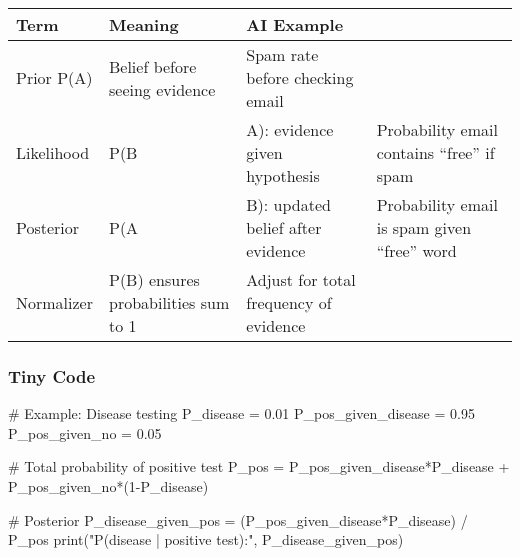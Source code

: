 \documentclass[
  letterpaper,
  DIV=11,
  numbers=noendperiod]{scrreprt}
\newenvironment{Shaded}{\begin{snugshade}}{\end{snugshade}}
\newcommand{\BuiltInTok}[1]{\textcolor[rgb]{0.00,0.23,0.31}{#1}}
\newcommand{\CommentTok}[1]{\textcolor[rgb]{0.37,0.37,0.37}{#1}}
\newcommand{\DecValTok}[1]{\textcolor[rgb]{0.68,0.00,0.00}{#1}}
\newcommand{\FloatTok}[1]{\textcolor[rgb]{0.68,0.00,0.00}{#1}}
\newcommand{\NormalTok}[1]{\textcolor[rgb]{0.00,0.23,0.31}{#1}}
\newcommand{\OperatorTok}[1]{\textcolor[rgb]{0.37,0.37,0.37}{#1}}
\newcommand{\StringTok}[1]{\textcolor[rgb]{0.13,0.47,0.30}{#1}}
\begin{document}
\begin{longtable}[]{@{}
  >{\raggedright\arraybackslash}p{}
  >{\raggedright\arraybackslash}p{}
  >{\raggedright\arraybackslash}p{}
  >{\raggedright\arraybackslash}p{}@{}}
\toprule\noalign{}
\begin{minipage}[b]{\linewidth}\raggedright
Term
\end{minipage} & \begin{minipage}[b]{\linewidth}\raggedright
Meaning
\end{minipage} & \begin{minipage}[b]{\linewidth}\raggedright
AI Example
\end{minipage} & \begin{minipage}[b]{\linewidth}\raggedright
\end{minipage} \\
\midrule\noalign{}
\endhead
\bottomrule\noalign{}
\endlastfoot
Prior P(A) & Belief before seeing evidence & Spam rate before checking
email & \\
Likelihood & P(B & A): evidence given hypothesis & Probability email
contains ``free'' if spam \\
Posterior & P(A & B): updated belief after evidence & Probability email
is spam given ``free'' word \\
Normalizer & P(B) ensures probabilities sum to 1 & Adjust for total
frequency of evidence & \\
\end{longtable}

\subsubsection{Tiny Code}\label{tiny-code-128}

\begin{Shaded}
\begin{Highlighting}[]
\CommentTok{\# Example: Disease testing}
\NormalTok{P\_disease }\OperatorTok{=} \FloatTok{0.01}
\NormalTok{P\_pos\_given\_disease }\OperatorTok{=} \FloatTok{0.95}
\NormalTok{P\_pos\_given\_no }\OperatorTok{=} \FloatTok{0.05}

\CommentTok{\# Total probability of positive test}
\NormalTok{P\_pos }\OperatorTok{=}\NormalTok{ P\_pos\_given\_disease}\OperatorTok{*}\NormalTok{P\_disease }\OperatorTok{+}\NormalTok{ P\_pos\_given\_no}\OperatorTok{*}\NormalTok{(}\DecValTok{1}\OperatorTok{{-}}\NormalTok{P\_disease)}

\CommentTok{\# Posterior}
\NormalTok{P\_disease\_given\_pos }\OperatorTok{=}\NormalTok{ (P\_pos\_given\_disease}\OperatorTok{*}\NormalTok{P\_disease) }\OperatorTok{/}\NormalTok{ P\_pos}
\BuiltInTok{print}\NormalTok{(}\StringTok{"P(disease | positive test):"}\NormalTok{, P\_disease\_given\_pos)}
\end{Highlighting}
\end{Shaded}
\end{document}
